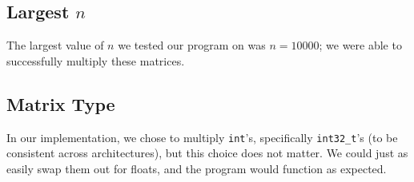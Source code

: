 \documentclass[solution, letterpaper]{cs121}
\begin{document}
\subsection*{Largest $n$}
\hspace{4mm} The largest value of $n$ we tested our program on was $n = 10000$; we were able to successfully multiply these matrices.

\subsection*{Matrix Type}
\hspace{4mm} In our implementation, we chose to multiply {\tt int}'s, specifically {\tt int32\_t}'s (to be consistent across architectures), but this choice does not matter. We could just as easily swap them out for floats, and the program would function as expected.
\end{document}
